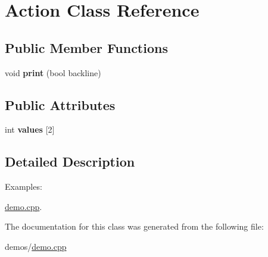 \hypertarget{classAction}{}\section{Action Class Reference}
\label{classAction}
\subsection*{Public Member Functions}
\begin{DoxyCompactItemize}
\item 
void {\bfseries print} (bool backline)\hypertarget{classAction_af84767113e5cb4645db17e570afc6a0e}{}\label{classAction_af84767113e5cb4645db17e570afc6a0e}

\end{DoxyCompactItemize}
\subsection*{Public Attributes}
\begin{DoxyCompactItemize}
\item 
int {\bfseries values} \mbox{[}2\mbox{]}\hypertarget{classAction_af8e52b4b916b835965d83fce59f82d3e}{}\label{classAction_af8e52b4b916b835965d83fce59f82d3e}

\end{DoxyCompactItemize}


\subsection{Detailed Description}
\begin{Desc}
\item[Examples\+: ]\par
\hyperlink{demo_8cpp-example}{demo.\+cpp}.\end{Desc}


The documentation for this class was generated from the following file\+:\begin{DoxyCompactItemize}
\item 
demos/\hyperlink{demo_8cpp}{demo.\+cpp}\end{DoxyCompactItemize}
